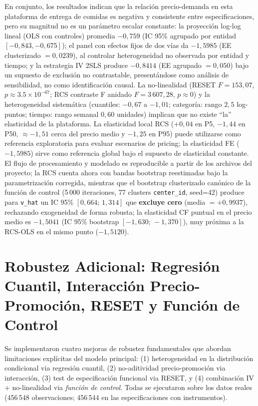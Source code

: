 \documentclass[doc, a4paper, biblatex, floatsintext, longtable, babel]{apa7}
\begin{document}
En conjunto, los resultados indican que la relación precio-demanda en esta plataforma de entrega de comidas es negativa y consistente entre especificaciones, pero su magnitud no es un parámetro escalar constante: la proyección log-log lineal (OLS con controles) promedia $-0,759$ (IC 95\% agrupado por entidad $[-0,843, -0,675]$); el panel con efectos fijos de dos vías da $-1,5985$ (EE clusterizado $=0,0239$), al controlar heterogeneidad no observada por entidad y tiempo; y la estrategia IV 2SLS produce $-0,8414$ (EE agrupado $=0,050$) bajo un supuesto de exclusión no contrastable, presentándose como análisis de sensibilidad, no como identificación causal. La no-linealidad (RESET $F=153,07$, $p \approx 3.5 \times 10^{-67}$; RCS contraste F anidado $F=3\,607,28$, $p \approx0$) y la heterogeneidad sistemática (cuantiles: $-0,67$ a $-1,01$; categoría: rango $2,5$ log-puntos; tiempo: rango semanal $0,60$ unidades) implican que no existe ``la'' elasticidad de la plataforma. La elasticidad local RCS ($+0,04$ en P5, $-1,44$ en P50, $\approx -1,51$ cerca del precio medio y $-1,25$ en P95) puede utilizarse como referencia exploratoria para evaluar escenarios de pricing; la elasticidad FE ($-1,5985$) sirve como referencia global bajo el supuesto de elasticidad constante. El flujo de procesamiento y modelado es reproducible a partir de los archivos del proyecto; la RCS cuenta ahora con bandas bootstrap reestimadas bajo la parametrización corregida, mientras que el bootstrap clusterizado canónico de la función de control (5\,000 iteraciones, 77 clusters \texttt{center\_id}, seed=42) produce para \texttt{v\_hat} un IC 95\% $[0,664;\,1,314]$ que \textbf{excluye cero} (media $=+0,9937$), rechazando exogeneidad de forma robusta; la elasticidad CF puntual en el precio medio es $-1,5041$ (IC 95\% bootstrap $[-1,630;\,-1,370]$), muy próxima a la RCS-OLS en el mismo punto ($-1,5120$).

\section{Robustez Adicional: Regresión Cuantil, Interacción Precio-Promoción, RESET y Función de Control}
\label{sec:robustez_adicional_21}

Se implementaron cuatro mejoras de robustez fundamentales que abordan limitaciones expl\'icitas del modelo principal: (1) heterogeneidad en la distribuci\'on condicional via regresión cuantil, (2) no-aditividad precio-promoci\'on via interacci\'on, (3) test de especificación funcional via RESET, y (4) combinaci\'on IV + no-linealidad via \textit{función de control}. Todas se ejecutaron sobre los datos reales (456\,548 observaciones; 456\,544 en las especificaciones con instrumentos).
\end{document}
